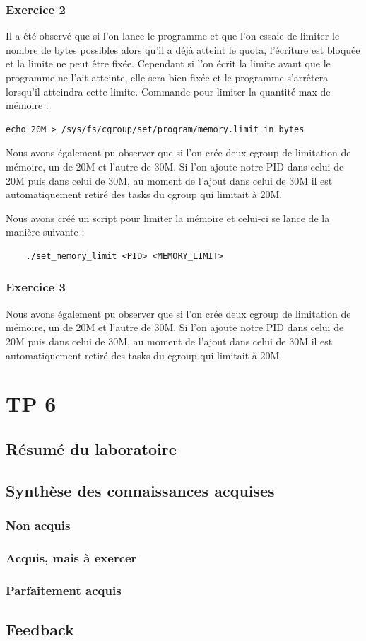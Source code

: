 \documentclass{ReportTemplate}
\begin{document}
\subsection{Exercice 2}
Il a été observé que si l'on lance le programme et que l'on essaie de limiter le
nombre de bytes possibles alors qu'il a déjà atteint le quota, l'écriture est
bloquée et la limite ne peut être fixée. Cependant si l'on écrit la limite avant
que le programme ne l'ait atteinte, elle sera bien fixée et le programme
s'arrêtera lorsqu'il atteindra cette limite.\newline
Commande pour limiter la quantité max de mémoire :
\begin{verbatim}
echo 20M > /sys/fs/cgroup/set/program/memory.limit_in_bytes
\end{verbatim}

Nous avons également pu observer que si l'on crée deux cgroup de limitation de
mémoire, un de 20M et l'autre de 30M. Si l'on ajoute notre PID dans celui de 20M
puis dans celui de 30M, au moment de l'ajout dans celui de 30M il est
automatiquement retiré des tasks du cgroup qui limitait à 20M.\newline

Nous avons créé un script pour limiter la mémoire et celui-ci se lance de la
manière suivante : 
\begin{verbatim}
    ./set_memory_limit <PID> <MEMORY_LIMIT>
\end{verbatim}

\subsection{Exercice 3}
Nous avons également pu observer que si l'on crée deux cgroup de limitation de
mémoire, un de 20M et l'autre de 30M. Si l'on ajoute notre PID dans celui de 20M
puis dans celui de 30M, au moment de l'ajout dans celui de 30M il est
automatiquement retiré des tasks du cgroup qui limitait à 20M.

\chapter{TP 6}
\section{Résumé du laboratoire}

\section{Synthèse des connaissances acquises}
\subsection{Non acquis}

\subsection{Acquis, mais à exercer}

\subsection{Parfaitement acquis}

\section{Feedback}
\end{document}
